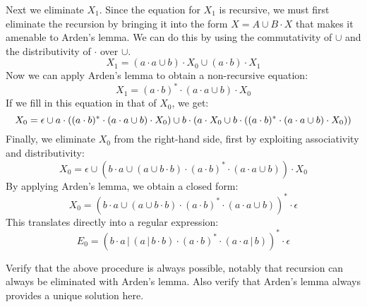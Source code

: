 \begin{example}
Next we eliminate $X_1$. Since the equation for $X_1$ is recursive, we must first 
eliminate the recursion by bringing it into the form $X = A \cup B \cdot X$
that makes it amenable to Arden's lemma. We can do this by using the commutativity of $\cup$
and the distributivity of $\cdot$ over $\cup$.
\begin{equation*}
X_1 = (a \cdot a \cup b) \cdot X_0 \cup (a \cdot b) \cdot X_1
\end{equation*}
Now we can apply Arden's lemma to obtain a non-recursive equation:
\begin{equation*}
X_1 = (a \cdot b)^* \cdot (a \cdot a \cup b) \cdot X_0 
\end{equation*}
If we fill in this equation in that of $X_0$, we get:
\begin{equation*}
X_0 = \epsilon  \cup a \cdot ((a \cdot b)^* \cdot (a \cdot a \cup b) \cdot X_0) \cup b \cdot (a \cdot X_0 \cup b \cdot ((a \cdot b)^* \cdot (a \cdot a \cup b) \cdot X_0))\\
\end{equation*}
Finally, we eliminate $X_0$ from the right-hand side, first by exploiting associativity and distributivity:
\begin{equation*}
X_0 = \epsilon \cup (b \cdot a \cup (a \cup b \cdot b) \cdot (a \cdot b)^* \cdot (a \cdot a \cup b)) \cdot X_0
\end{equation*}
By applying Arden's lemma, we obtain a closed form:
\begin{equation*}
X_0 =(b \cdot a \cup (a \cup b \cdot b) \cdot (a \cdot b)^* \cdot (a \cdot a \cup b))^* \cdot \epsilon 
\end{equation*}
This translates directly into a regular expression:
\begin{equation*}
E_0 =(b \cdot a \,|\, (a \,|\, b \cdot b) \cdot (a \cdot b)^* \cdot (a \cdot a \,|\, b))^* \cdot \epsilon 
\end{equation*}
\end{example}


Verify that the above procedure is always possible, notably that recursion can always be eliminated with Arden's lemma. Also verify that Arden's lemma always provides a unique solution here.

